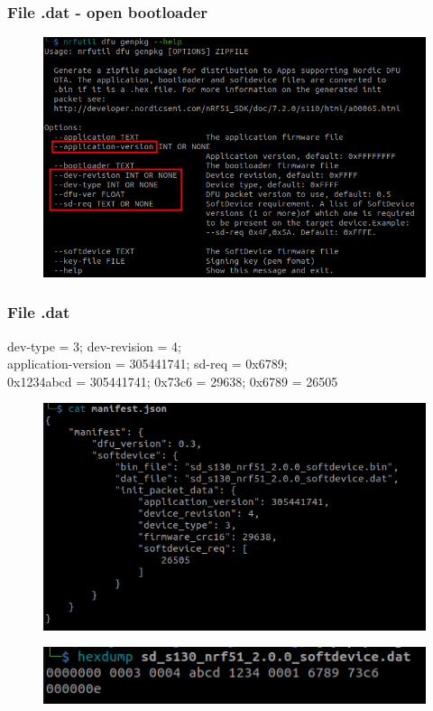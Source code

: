 \documentclass[34pt]{beamer}
\begin{document}
\begin{frame}
	\frametitle{File .dat - open bootloader}
	
\begin{figure}[H]
	\centering
	\includegraphics[width=1\linewidth]{../project_Report/images/old-nrfutil-options}
\end{figure}
	
\end{frame}

\begin{frame}
	\frametitle{File .dat}
	dev-type = 3; dev-revision = 4;\\
	application-version = 305441741; sd-req = 0x6789;\\
	0x1234abcd = 305441741; 0x73c6 = 29638; 0x6789 = 26505
	\begin{figure}[H]
		\centering
		\includegraphics[width=0.7\linewidth]{old-nrfutil-options}
	\end{figure}
	\begin{figure}[H]
		\centering
		\includegraphics[width=0.7\linewidth]{hexdump-file-dat-open}
	\end{figure}

\end{frame}
\end{document}
